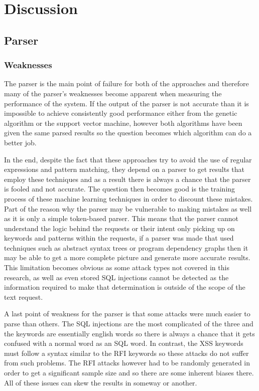 \chapter{Discussion}

\section{Parser}
\subsection{Weaknesses}\label{sec:parseWeak}

The parser is the main point of failure for both of the approaches and therefore many of the parser's weaknesses become apparent when measuring the performance of the system.  If the output of the parser is not accurate than it is impossible to achieve consistently good performance either from the genetic algorithm or the support vector machine, however both algorithms have been given the same parsed results so the question becomes which algorithm can do a better job.  

In the end, despite the fact that these approaches try to avoid the use of regular expressions and pattern matching, they depend on a parser to get results that employ these techniques and as a result there is always a chance that the parser is fooled and not accurate.  The question then becomes good is the training process of these machine learning techniques in order to discount these mistakes.  Part of the reason why the parser may be vulnerable to making mistakes as well as it is only a simple token-based parser.  This means that the parser cannot understand the logic behind the requests or their intent only picking up on keywords and patterns within the requests, if a parser was made that used techniques such as abstract syntax trees or program dependency graphs then it may be able to get a more complete picture and generate more accurate results.  This limitation becomes obvious as some attack types not covered in this research, as well as even stored SQL injections cannot be detected as the information required to make that determination is outside of the scope of the text request.

A last point of weakness for the parser is that some attacks were much easier to parse than others.  The SQL injections are the most complicated of the three and the keywords are essentially english words so there is always a chance that it gets confused with a normal word as an SQL word.  In contrast, the XSS keywords must follow a syntax similar to the RFI keywords so these attacks do not suffer from such problems.  The RFI attacks however had to be randomly generated in order to get a significant sample size and so there are some inherent biases there.  All of these issues can skew the results in someway or another.

